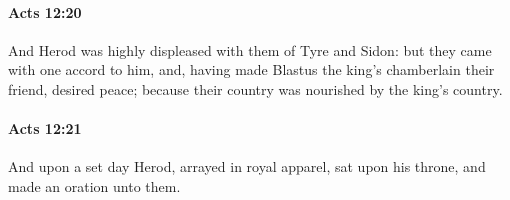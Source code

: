 		\paragraph{Acts 12:20} %
			\label{ACTS-12-20}

			And Herod was highly displeased with them of Tyre and Sidon: but they came with one accord to him, and, having made Blastus the king's chamberlain their friend, desired peace; because their country was nourished by the king's country.

			\begin{framed}
			\scriptsize
				\begin{compactdesc}
					\item[SBLG] 
				\end{compactdesc}
			\end{framed}

		\paragraph{Acts 12:21} %
			\label{ACTS-12-21}

			And upon a set day Herod, arrayed in royal apparel, sat upon his throne, and made an oration unto them.

